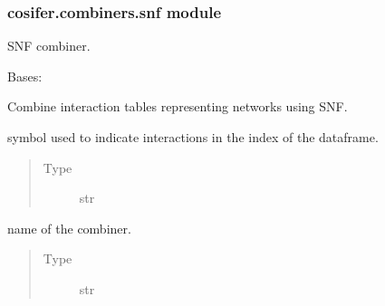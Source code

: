 \documentclass[letterpaper,10pt,english]{sphinxmanual}
\begin{document}
\subsubsection{cosifer.combiners.snf module}
\label{\detokenize{_modules/cosifer.combiners:module-cosifer.combiners.snf}}\label{\detokenize{_modules/cosifer.combiners:cosifer-combiners-snf-module}}
SNF combiner.

\begin{fulllineitems}
\label{\detokenize{_modules/cosifer.combiners:cosifer.combiners.snf.SNF}}
Bases: {\hyperref[\detokenize{_modules/cosifer.combiners:cosifer.combiners.network_combiner.NetworkCombiner}]{}}

Combine interaction tables representing networks using SNF.

\begin{fulllineitems}
\label{\detokenize{_modules/cosifer.combiners:cosifer.combiners.snf.SNF.interaction_symbol}}
symbol used to indicate
interactions in the index of the dataframe.
\begin{quote}\begin{description}
\item[{Type}] \leavevmode
str

\end{description}\end{quote}

\end{fulllineitems}


\begin{fulllineitems}
\label{\detokenize{_modules/cosifer.combiners:cosifer.combiners.snf.SNF.name}}
name of the combiner.
\begin{quote}\begin{description}
\item[{Type}] \leavevmode
str

\end{description}\end{quote}

\end{fulllineitems}


\end{fulllineitems}
\end{document}
